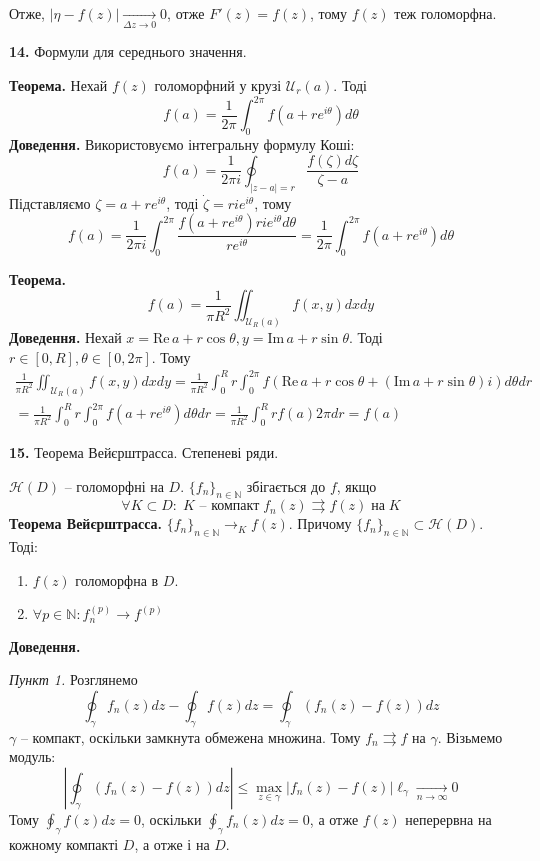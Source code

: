 \documentclass[14pt]{extarticle}
\begin{document}
Отже, $|\eta-f(z)| \xrightarrow[\Delta z \to 0]{} 0$, отже $F'(z)=f(z)$, тому $f(z)$ теж голоморфна.

\textbf{14.} Формули для середнього значення.

\textbf{Теорема.} Нехай $f(z)$ голоморфний у крузі $\mathcal{U}_r(a)$. Тоді
\[
f(a) = \frac{1}{2\pi}\int_0^{2\pi} f(a+re^{i\theta})d\theta
\]
\textbf{Доведення.} Використовуємо інтегральну формулу Коші:
\[
f(a) = \frac{1}{2\pi i}\oint_{|z-a|=r}\frac{f(\zeta)d\zeta}{\zeta-a}
\]
Підставляємо $\zeta=a+re^{i\theta}$, тоді $\dot{\zeta}=rie^{i\theta}$, тому
\[
f(a) = \frac{1}{2\pi i}\int_{0}^{2\pi} \frac{f(a+re^{i\theta})rie^{i\theta}d\theta}{re^{i\theta}} = \frac{1}{2\pi}\int_0^{2\pi}f(a+re^{i\theta})d\theta
\]

\textbf{Теорема.} 
\[
f(a) = \frac{1}{\pi R^2}\iint_{\mathcal{U}_R(a)} f(x,y)dxdy
\]
\textbf{Доведення.} Нехай $x=\text{Re}\,a + r \cos\theta,y=\text{Im}\, a + r \sin\theta$. Тоді $r \in [0,R], \theta\in[0,2\pi]$. Тому
\begin{gather*}
\frac{1}{\pi R^2}\iint_{\mathcal{U}_R(a)} f(x,y)dxdy = \frac{1}{\pi R^2}\int_0^R r\int_0^{2\pi}f(\text{Re}\, a + r\cos\theta +(\text{Im}\, a + r\sin\theta)i) d\theta dr \\
= \frac{1}{\pi R^2}\int_0^R r \int_0^{2\pi}f(a+re^{i\theta})d\theta dr = \frac{1}{\pi R^2} \int_0^R rf(a)2\pi dr  = f(a)
\end{gather*}

\textbf{15.} Теорема Вейєрштрасса. Степеневі ряди.

$\mathcal{H}(D)$ -- голоморфні на $D$. $\{f_n\}_{n \in \mathbb{N}}$ збігається до $f$, якщо 
\[
\forall K \subset D: \; K \text{ -- компакт} \; f_n(z) \rightrightarrows f(z) \; \text{на} \; K
\]
\textbf{Теорема Вейєрштрасса.} $\{f_n\}_{n \in \mathbb{N}} \to_K f(z)$. Причому $\{f_n\}_{n \in \mathbb{N}} \subset \mathcal{H}(D)$. Тоді:
\begin{enumerate}
    \item $f(z)$ голоморфна в $D$.
    \item $\forall p \in \mathbb{N}: f_n^{(p)} \to f^{(p)}$
\end{enumerate}

\textbf{Доведення.} 

\textit{Пункт 1.} Розглянемо
\[
\oint_{\gamma} f_n(z)dz - \oint_{\gamma}f(z)dz = \oint_{\gamma}(f_n(z)-f(z))dz
\]
$\gamma$ -- компакт, оскільки замкнута обмежена множина. Тому $f_n \rightrightarrows f$ на $\gamma$. Візьмемо модуль:
\[
\left|\oint_{\gamma}(f_n(z)-f(z))dz\right| \leq \max_{z \in \gamma}|f_n(z)-f(z)| \ell_{\gamma} \xrightarrow[n \to \infty]{} 0
\]
Тому $\oint_{\gamma}f(z)dz=0$, оскільки $\oint_{\gamma}f_n(z)dz=0$, а отже $f(z)$ неперервна на кожному компакті $D$, а отже і на $D$. 
\end{document}
